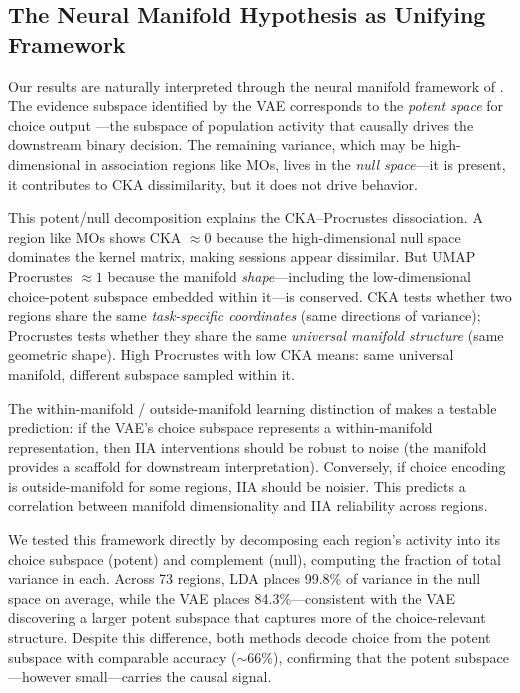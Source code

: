 \documentclass{article}
\begin{document}
\subsection{The Neural Manifold Hypothesis as Unifying Framework}

Our results are naturally interpreted through the neural manifold framework of \citet{gallego2017neural}. The evidence subspace identified by the VAE corresponds to the \emph{potent space} for choice output \citep{kaufman2014cortical}---the subspace of population activity that causally drives the downstream binary decision. The remaining variance, which may be high-dimensional in association regions like MOs, lives in the \emph{null space}---it is present, it contributes to CKA dissimilarity, but it does not drive behavior.

This potent/null decomposition explains the CKA--Procrustes dissociation. A region like MOs shows CKA $\approx 0$ because the high-dimensional null space dominates the kernel matrix, making sessions appear dissimilar. But UMAP Procrustes $\approx 1$ because the manifold \emph{shape}---including the low-dimensional choice-potent subspace embedded within it---is conserved. CKA tests whether two regions share the same \emph{task-specific coordinates} (same directions of variance); Procrustes tests whether they share the same \emph{universal manifold structure} (same geometric shape). High Procrustes with low CKA means: same universal manifold, different subspace sampled within it.

The within-manifold / outside-manifold learning distinction of \citet{sadtler2014neural} makes a testable prediction: if the VAE's choice subspace represents a within-manifold representation, then IIA interventions should be robust to noise (the manifold provides a scaffold for downstream interpretation). Conversely, if choice encoding is outside-manifold for some regions, IIA should be noisier. This predicts a correlation between manifold dimensionality and IIA reliability across regions.

We tested this framework directly by decomposing each region's activity into its choice subspace (potent) and complement (null), computing the fraction of total variance in each. Across 73 regions, LDA places 99.8\% of variance in the null space on average, while the VAE places 84.3\%---consistent with the VAE discovering a larger potent subspace that captures more of the choice-relevant structure. Despite this difference, both methods decode choice from the potent subspace with comparable accuracy ($\sim$66\%), confirming that the potent subspace---however small---carries the causal signal.
\end{document}
